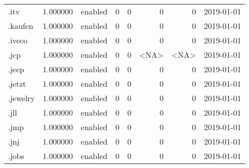 \begin{tabular}{lrlrrrrl}
.itv                      &          1.000000 &         enabled &                           0 &                           0 &                           0 &                   0 &           2019-01-01 \\
.kaufen                   &          1.000000 &         enabled &                           0 &                           0 &                           0 &                   0 &           2019-01-01 \\
.iveco                    &          1.000000 &         enabled &                           0 &                           0 &                           0 &                   0 &           2019-01-01 \\
.jcp                      &          1.000000 &         enabled &                           0 &                           0 &                        <NA> &                <NA> &           2019-01-01 \\
.jeep                     &          1.000000 &         enabled &                           0 &                           0 &                           0 &                   0 &           2019-01-01 \\
.jetzt                    &          1.000000 &         enabled &                           0 &                           0 &                           0 &                   0 &           2019-01-01 \\
.jewelry                  &          1.000000 &         enabled &                           0 &                           0 &                           0 &                   0 &           2019-01-01 \\
.jll                      &          1.000000 &         enabled &                           0 &                           0 &                           0 &                   0 &           2019-01-01 \\
.jmp                      &          1.000000 &         enabled &                           0 &                           0 &                           0 &                   0 &           2019-01-01 \\
.jnj                      &          1.000000 &         enabled &                           0 &                           0 &                           0 &                   0 &           2019-01-01 \\
.jobs                     &          1.000000 &         enabled &                           0 &                           0 &                           0 &                   0 &           2019-01-01 \\

\end{tabular}
